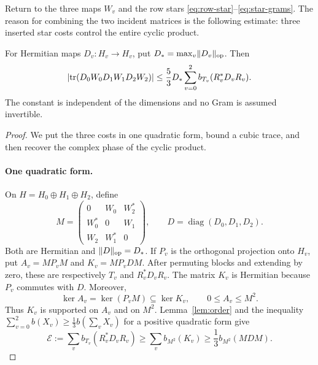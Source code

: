 Return to the three maps $W_v$ and the row stars
\eqref{eq:row-star}--\eqref{eq:star-grams}. The reason for combining
the two incident matrices is the following estimate: three inserted
star costs control the entire cyclic product.

\begin{lemma}\label{lem:mixed-trace}
For Hermitian maps $D_v:H_v\to H_v$, put
$D_* =\max_v\lVert D_v\rVert_{\mathrm{op}}$.  Then
\begin{equation}\label{eq:mixed-trace}
 \left|\operatorname{tr}(D_0W_0D_1W_1D_2W_2)\right|
 \le\frac53D_*\sum_{v=0}^2b_{T_v}(R_v^*D_vR_v).
\end{equation}
The constant is independent of the dimensions and no Gram is
assumed invertible.
\end{lemma}

\begin{proof}
We put the three costs in one quadratic form, bound a cubic trace,
and then recover the complex phase of the cyclic product.

\paragraph{One quadratic form.}
On $H=H_0\oplus H_1\oplus H_2$, define
\[
 M=\begin{pmatrix}
 0&W_0&W_2^*\\
 W_0^*&0&W_1\\
 W_2&W_1^*&0
 \end{pmatrix},\qquad
 D=\operatorname{diag}(D_0,D_1,D_2).
\]
Both are Hermitian and $\lVert D\rVert_{\mathrm{op}}=D_*$.  If $P_v$ is
the orthogonal projection onto $H_v$, put
$A_v=MP_vM$ and $K_v=MP_vDM$.  After permuting blocks and extending
by zero, these are respectively $T_v$ and $R_v^*D_vR_v$.
The matrix $K_v$ is Hermitian because $P_v$ commutes with $D$.
Moreover,
\[
 \ker A_v=\ker(P_vM)\subseteq\ker K_v,
 \qquad 0\le A_v\le M^2.
\]
Thus $K_v$ is supported on $A_v$ and on $M^2$.  Lemma~\ref{lem:order}
and the inequality $\sum_{v=0}^2 b(X_v)\ge\tfrac13 b(\sum_vX_v)$
for a positive quadratic form give
\begin{equation}\label{eq:trace-common-metric}
 \mathcal E:=\sum_v b_{T_v}(R_v^*D_vR_v)
 \ge\sum_v b_{M^2}(K_v)
 \ge\frac13 b_{M^2}(MDM).
\end{equation}


\end{proof}
